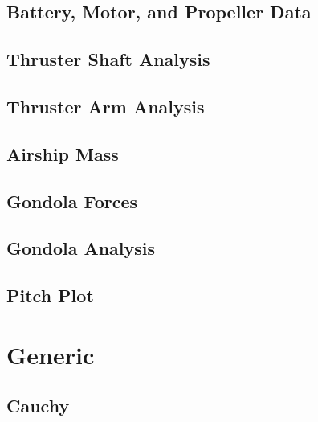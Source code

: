 \documentclass[]{book}
\begin{document}
\subsection{Battery, Motor, and Propeller Data} \label{code:bmpData}

\subsection{Thruster Shaft Analysis} \label{code:thrusterShaft}


\subsection{Thruster Arm Analysis} \label{code:arm}


\subsection{Airship Mass} \label{code:mass}

\subsection{Gondola Forces} \label{code:gondolaforce}

\subsection{Gondola Analysis} \label{code:gondola}

\subsection{Pitch Plot} \label{code:pitch}


\section{Generic}
\subsection{Cauchy} \label{code:cauchy}

\end{document}
